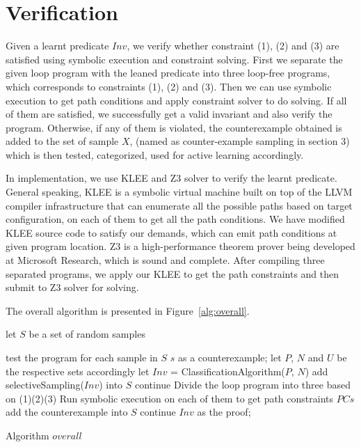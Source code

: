 
\section{Verification} %
\label{sec:verification}

Given a learnt predicate $Inv$, we verify whether constraint (1), (2) and (3) are satisfied using symbolic execution and constraint solving.
First we separate the given loop program with the leaned predicate into three loop-free programs,
which corresponds to constraints (1), (2) and (3). 
Then we can use symbolic execution to get path conditions and apply constraint solver to do solving.
If all of them are satisfied, we successfully get a valid invariant and also verify the program. 
Otherwise, if any of them is violated, the counterexample obtained is added to the set of sample $X$, (named as counter-example sampling in section 3)
which is then tested, categorized, used for active learning accordingly.

In implementation, we use KLEE and Z3 solver to verify the learnt predicate.
General speaking, KLEE is a symbolic virtual machine built on top of the LLVM compiler infrastructure
that can enumerate all the possible paths based on target configuration, on each of them to get all the path conditions.
We have modified KLEE source code to satisfy our demands, which can emit path conditions at given program location.
Z3 is a high-performance theorem prover being developed at Microsoft Research, which is sound and complete.
After compiling three separated programs, we apply our KLEE to get the path constraints and then submit to Z3 solver for solving.


 
The overall algorithm is presented in Figure~\ref{alg:overall}.
\begin{algorithm}[t]
\SetAlgoVlined
\Indm
{}
\Indp
let $S$ be a set of random samples\;
 {
    test the program for each sample in $S$\;
     {
        \Return $s$ as a counterexample;
    }
    let $P$, $N$ and $U$ be the respective sets accordingly\;
    let $Inv$ = ClassificationAlgorithm($P$, $N$)\;
     {
        add selectiveSampling($Inv$) into $S$\;
        continue\;
    }
    Divide the loop program into three based on (1)(2)(3)\;
    Run symbolic execution on each of them to get path constraints $PCs$\;
     {
         {
            add the counterexample into $S$\;
            continue\;
        }
    }
    \Return $Inv$ as the proof;
    
}
\caption{Algorithm $overall$}
\label{alg:overall}
\end{algorithm}


